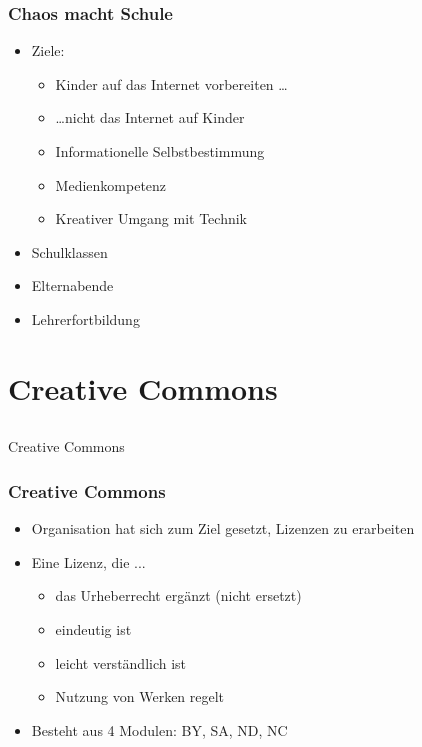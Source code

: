 \documentclass[table]{beamer}
\begin{document}
\begin{frame}
    \frametitle{Chaos macht Schule}
    \begin{itemize}
        \item<2->Ziele:
            \begin{itemize}
                \item<3-> Kinder auf das Internet vorbereiten \ldots
                \item<4-> \ldots nicht das Internet auf Kinder
                \item<5-> Informationelle Selbstbestimmung
                \item<6-> Medienkompetenz
                \item<7-> Kreativer Umgang mit Technik
            \end{itemize}
        \item<8-> Schulklassen
        \item<9-> Elternabende
        \item<10-> Lehrerfortbildung
    \end{itemize}
\end{frame}

\section{Creative Commons}
\subsection{}

\begin{frame}
    \begin{center}\Large
    Creative Commons
    \end {center}
\end{frame}

\begin{frame}
    \frametitle{Creative Commons}
    \begin{itemize}
        \item<2-> Organisation hat sich zum Ziel gesetzt, Lizenzen zu erarbeiten
        \item<3-> Eine Lizenz, die ...
            \begin{itemize}
                \item<5-> das Urheberrecht ergänzt (nicht ersetzt)
                \item<6-> eindeutig ist
                \item<7-> leicht verständlich ist
                \item<8-> Nutzung von Werken regelt
            \end{itemize}
        \item<9-> Besteht aus 4 Modulen: BY, SA, ND, NC
    \end{itemize}
\end{frame}
\end{document}

